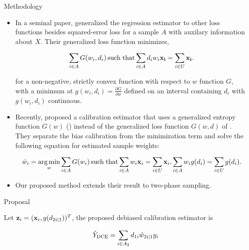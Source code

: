 \documentclass[final]{beamer}
\DeclareMathOperator*{\argmin}{arg\,min}
\DeclareMathOperator*{\suchthat}{such\; that}
\newlength{\colwidth}
\begin{document}
\begin{frame}[t]
\begin{columns}[t]
\begin{column}{\colwidth}
\begin{block}{Methodology}

    \begin{itemize}
      \item In a seminal paper, \cite{deville1992calibration} generalized the
        regression estimator to other loss functions besides squared-error loss
        for a sample $A$ with auxilary information about $X$. Their generalized
        loss function minimizes,

        $$
        \sum_{i \in A} G(w_{i}, d_{i}) \suchthat \sum_{i \in
        A} d_{i} w_{i} {\bf x_i} = \sum_{i \in U} {\bf x_i}.
        $$

        for a non-negative, strictly convex function with respect to $w$
        function $G$, with a minimum at $g(w_i, d_i) = \frac{\partial G}{\partial
        w}$ defined on an interval containing $d_{i}$ with $g(w_i, d_i)$
        continuous.
    \end{itemize}


    \begin{itemize}
      \item Recently, \cite{kwon2024debiased} proposed a calibration estimator that
        uses a generalized entropy function $G(w)$ (\cite{gneiting2007strictly})
        instead of the generalized loss function $G(w, d)$ of
        \cite{deville1992calibration}. They separate the bias calibration from
        the minimization term and solve the following equation for estimated
        sample weights:

        $$
        \hat w_{i} = \argmin_{w} \sum_{i \in A} G(w_i)
        \suchthat \sum_{i \in A} w_{i} {\bf{x}}_i = 
        \sum_{i \in U} {\bf{x}}_i,
        \sum_{i \in A} w_i g(d_i) = \sum_{i \in U} g(d_i) .
        $$

      \item Our proposed method extends their result to two-phase sampling.
    \end{itemize}

  \end{block}

  \begin{alertblock}{Proposal}

    Let ${\bf{z}}_i = ({\bf x}_i, g(d_{2i|1}))^T$, the proposed debiased
    calibration estimator is 
    \vspace{-1.0cm}

    \begin{equation}
    \hat Y_{\rm{DCE}} = \sum_{i \in A_2} d_{1i} \hat w_{2i|1} y_i
    \end{equation}


\end{alertblock}
\end{column}
\end{columns}
\end{frame}
\end{document}
